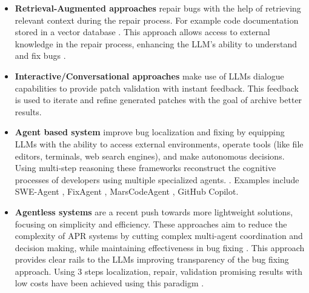 \begin{itemize}
    \item \textbf{Retrieval-Augmented approaches} repair bugs with the help of retrieving relevant context during the repair process. For example code documentation stored in a vector database \cite{puvvadiCodingAgentsComprehensive2025}. This approach allows access to  external knowledge in the repair process, enhancing the LLM's ability to understand and fix bugs \cite{houLargeLanguageModels2024, yinThinkRepairSelfDirectedAutomated2024}.

    \item \textbf{Interactive/Conversational approaches} make use of LLMs dialogue capabilities to provide patch validation with instant feedback. \cite{xiaAutomatedProgramRepair2024, huCanGPTO1Kill2024} This feedback is used to iterate and refine generated patches with the goal of archive better results. \cite{xiaAutomatedProgramRepair2024}

    \item \textbf{Agent based system} improve bug localization and fixing by equipping LLMs with the ability to access external environments, operate tools (like file editors, terminals, web search engines), and make autonomous decisions. \cite{anandComprehensiveSurveyAIDriven2024, puvvadiCodingAgentsComprehensive2025, mengEmpiricalStudyLLMbased2024} Using multi-step reasoning these frameworks reconstruct the cognitive processes of developers using multiple specialized agents. \cite{rondonEvaluatingAgentbasedProgram2025,zhangPATCHEmpoweringLarge2025, leeUnifiedDebuggingApproach2024}. Examples include SWE-Agent \cite{yangSWEagentAgentComputerInterfaces2024}, FixAgent \cite{leeUnifiedDebuggingApproach2024}, MarsCodeAgent \cite{liuMarsCodeAgentAInative2024}, GitHub Copilot.

    \item \textbf{Agentless systems} are a recent push towards more lightweight solutions, focusing on simplicity and efficiency. These approaches aim to reduce the complexity of APR systems by cutting complex multi-agent coordination and decision making, while maintaining effectiveness in bug fixing \cite{xiaAgentlessDemystifyingLLMbased2024,puvvadiCodingAgentsComprehensive2025}. This approach provides clear rails to the LLMs improving transparency of the bug fixing approach. Using 3 steps localization, repair, validation promising results with low costs have been achieved using this paradigm \cite{xiaAgentlessDemystifyingLLMbased2024, mengEmpiricalStudyLLMbased2024}.
\end{itemize}

